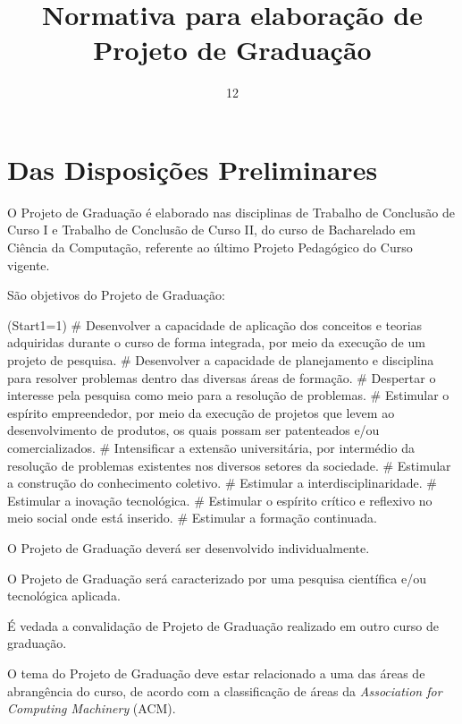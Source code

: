 \documentclass[12pt,geral,titlewithdate]{uftdocs}
\title{Normativa para elaboração de Projeto de Graduação}
\date{12}{11}{2016}
\begin{document}
\maketitle


\chapter{Das Disposições Preliminares}
\label{chap:disposicoes}


\artigo O Projeto de Graduação é elaborado nas disciplinas de Trabalho de Conclusão de Curso I e Trabalho de Conclusão de Curso II, do curso de Bacharelado em Ciência da Computação, referente ao último Projeto Pedagógico do Curso vigente.

\artigo São objetivos do Projeto de Graduação:

\begin{easylist}\ListProperties(Start1=1)
# Desenvolver a capacidade de aplicação dos conceitos e teorias adquiridas durante o curso de forma integrada, por meio da execução de um projeto de pesquisa.
# Desenvolver a capacidade de planejamento e disciplina para resolver problemas dentro das diversas áreas de formação.
# Despertar o interesse pela pesquisa como meio para a resolução de problemas.
# Estimular o espírito empreendedor, por meio da execução de projetos que levem ao desenvolvimento de produtos, os quais possam ser patenteados e/ou comercializados.
# Intensificar a extensão universitária, por intermédio da resolução de problemas existentes nos diversos setores da sociedade.
# Estimular a construção do conhecimento coletivo.
# Estimular a interdisciplinaridade.
# Estimular a inovação tecnológica.
# Estimular o espírito crítico e reflexivo no meio social onde está inserido.
# Estimular a formação continuada.
\end{easylist}

\artigo O Projeto de Graduação deverá ser desenvolvido individualmente. 

\begin{paragrafos}

\paragrafo O Projeto de Graduação será caracterizado por uma pesquisa científica e/ou tecnológica aplicada.

\paragrafo É vedada a convalidação de Projeto de Graduação realizado em outro curso de graduação.

\end{paragrafos}

\artigo O tema do Projeto de Graduação deve estar relacionado a uma das áreas de abrangência do curso, de acordo com a classificação de áreas da {\it Association for Computing Machinery} (ACM).
\end{document}
